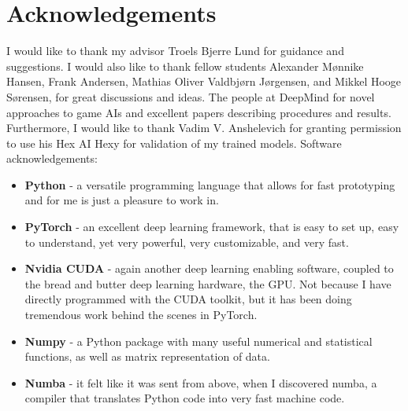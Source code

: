 \chapter{Acknowledgements}

I would like to thank my advisor Troels Bjerre Lund for guidance and suggestions. I would also like to thank fellow students Alexander Mønnike Hansen, Frank Andersen, Mathias Oliver Valdbjørn Jørgensen, and Mikkel Hooge Sørensen, for great discussions and ideas. The people at DeepMind for novel approaches to game AIs and excellent papers describing procedures and results. Furthermore, I would like to thank Vadim V. Anshelevich for granting permission to use his Hex AI Hexy for validation of my trained models. Software acknowledgements:
\begin{itemize}
  \item \textbf{Python} - a versatile programming language that allows for fast prototyping and for me is just a pleasure to work in.
  \item \textbf{PyTorch} - an excellent deep learning framework, that is easy to set up, easy to understand, yet very powerful, very customizable, and very fast.
  \item \textbf{Nvidia CUDA} - again another deep learning enabling software, coupled to the bread and butter deep learning hardware, the GPU. Not because I have directly programmed with the CUDA toolkit, but it has been doing tremendous work behind the scenes in PyTorch.
  \item \textbf{Numpy} - a Python package with many useful numerical and statistical functions, as well as matrix representation of data.
  \item \textbf{Numba} - it felt like it was sent from above, when I discovered numba, a compiler that translates Python code into very fast machine code.
\end{itemize}


